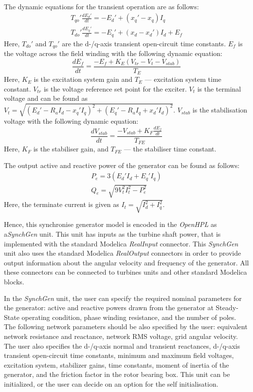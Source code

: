 \documentclass[%
]{USN-PhD}
\begin{document}
The dynamic equations for the transient operation are as follows:  \begin{equation}
\begin{array}{c}
T_{qo}'\frac{dE_d'}{dt} =-E_d' + (x_q' - x_q)I_q \\
T_{do}'\frac{dE_q'}{dt} = -E_q' + (x_d - x_d')I_d + E_f
\end{array}
\end{equation}
Here, $T_{do}'$ and $T_{qo}'$ are the d-/q-axis transient open-circuit time constants. $E_f$ is the voltage across the field winding with the following dynamic equation:
\begin{equation}
\frac{dE_f}{dt} = \frac{-E_f + K_E\left(V_{tr}-V_t-V_{stab}\right)}{T_E}
\end{equation}
Here, $K_E$ is the excitation system gain and $T_E$ --- excitation system time constant. $V_{tr}$ is the voltage reference set point for the exciter.
$V_t$ is the terminal voltage and can be found as $V_t = \sqrt{\left(E_d'-R_aI_d-x_q'I_q\right)^2+\left(E_q'-R_aI_q+x_d'I_d\right)^2}$. $V_{stab}$ is the stabilisation voltage with the following dynamic equation:
\begin{equation}
\frac{dV_{stab}}{dt} = \frac{-V_{stab} + K_F\frac{dE_f}{dt}}{T_{FE}}
\end{equation}
Here, $K_F$ is the stabiliser gain, and $T_{FE}$ --- the stabiliser time constant.

The output active and reactive power of the generator can be found as follows:
\begin{equation}
\begin{array}{c}
P_e = 3\left(E_d'I_d+E_q'I_q\right)\\
Q_e = \sqrt{9V_t^2I_t^2-P_e^2}
\end{array}
\end{equation}
Here, the terminate current is given as $I_t=\sqrt{I_d^2+I_q^2}$.

Hence, this synchronise generator model is encoded in the \emph{OpenHPL} as a\emph{SynchGen} unit. This unit has inputs as the turbine shaft power, that is implemented with the standard Modelica \emph{RealInput} connector. This \emph{SynchGen} unit also uses the standard Modelica \emph{RealOutput} connectors in order to provide output information about the angular velocity and frequency of the generator. All these connectors can be connected to turbines units and other standard Modelica blocks.

In the \emph{SynchGen} unit, the user can specify the required nominal parameters for the generator: active and reactive powers drawn from the generator at Steady-State operating condition, phase winding resistance, and the number of poles. The following network parameters should be also specified by the user: equivalent network resistance and reactance, network RMS voltage, grid angular velocity. The user also specifies the d-/q-axis normal and transient reactances, d-/q-axis transient open-circuit time constants, minimum and maximum field voltages, excitation system, stabilizer gains, time constants, moment of inertia of the generator, and the friction factor in the rotor bearing box. This unit can be initialized, or the user can decide on an option for the self initialisation.
\end{document}
